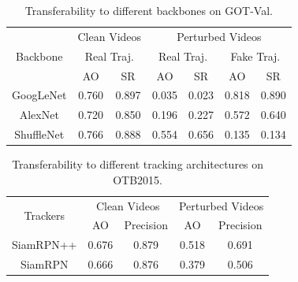 \documentclass{article}
\begin{document}
\begin{table}
\begin{center}
\footnotesize
\tabcolsep=2.0pt
\begin{tabular}{c|cc|cc|cc} 
\toprule
\multirow{3}{*}[-6pt]{Backbone} & \multicolumn{2}{c|}{Clean Videos}    & \multicolumn{4}{c}{Perturbed Videos}                                        \\ 
\cmidrule{2-7}
                          & \multicolumn{2}{c|}{Real Traj.} & \multicolumn{2}{c|}{Real Traj.} & \multicolumn{2}{c}{Fake Traj.}  \\ 
\cmidrule{2-7}
                          & AO    & SR                           & AO    & SR                           & AO    & SR                           \\ 
\midrule
GoogLeNet                 & 0.760 & 0.897                        & 0.035 & 0.023                        & 0.818 & 0.890                        \\
AlexNet                   & 0.720 & 0.850                        & 0.196 & 0.227                        & 0.572 & 0.640                        \\
ShuffleNet                & 0.766 & 0.888                        & 0.554 & 0.656                        & 0.135 & 0.134                        \\
\bottomrule
\end{tabular}
\end{center}
\caption{Transferability to different backbones on GOT-Val.}
\label{tab:backbone}
\end{table}

\begin{table}
\centering
\footnotesize
\tabcolsep=2.0pt
\begin{tabular}{c|cc|cc} 
\toprule
\multirow{2}{*}[-2pt]{Trackers} & \multicolumn{2}{c|}{Clean Videos} & \multicolumn{2}{c}{Perturbed Videos}  \\
\cmidrule{2-5}
                          & AO & Precision              & AO & Precision                   \\
\midrule
SiamRPN++                 & 0.676   & 0.879                  & 0.518   & 0.691                       \\
SiamRPN                   & 0.666   & 0.876                  & 0.379   & 0.506                       \\
\bottomrule
\end{tabular}
\caption{Transferability to different tracking architectures on OTB2015.}
\label{tab:arch}
\end{table}
\end{document}
